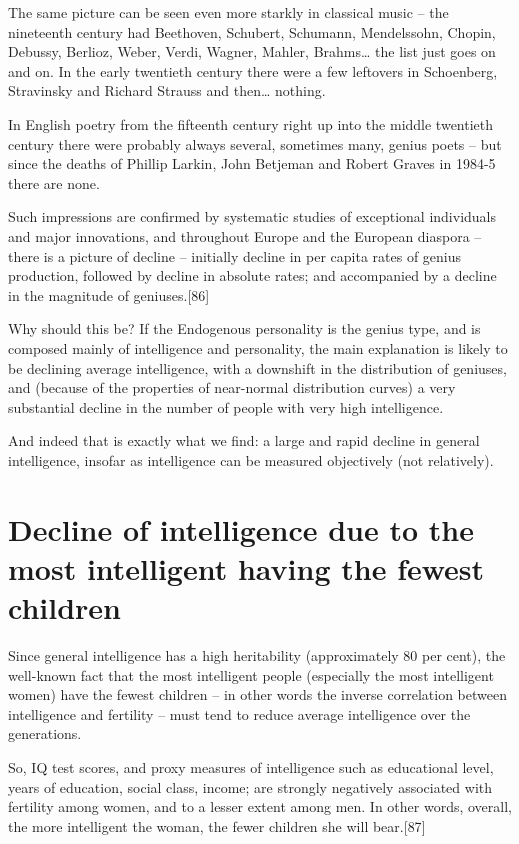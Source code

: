\documentclass[
]{book}
\begin{document}
The same picture can be seen even more starkly in classical music -- the nineteenth century had Beethoven, Schubert, Schumann, Mendelssohn, Chopin, Debussy, Berlioz, Weber, Verdi, Wagner, Mahler, Brahms\ldots{} the list just goes on and on. In the early twentieth century there were a few leftovers in Schoenberg, Stravinsky and Richard Strauss and then\ldots{} nothing.

In English poetry from the fifteenth century right up into the middle twentieth century there were probably always several, sometimes many, genius poets -- but since the deaths of Phillip Larkin, John Betjeman and Robert Graves in 1984-5 there are none.

Such impressions are confirmed by systematic studies of exceptional individuals and major innovations, and throughout Europe and the European diaspora -- there is a picture of decline -- initially decline in per capita rates of genius production, followed by decline in absolute rates; and accompanied by a decline in the magnitude of geniuses.{[}86{]}

Why should this be? If the Endogenous personality is the genius type, and is composed mainly of intelligence and personality, the main explanation is likely to be declining average intelligence, with a downshift in the distribution of geniuses, and (because of the properties of near-normal distribution curves) a very substantial decline in the number of people with very high intelligence.

And indeed that is exactly what we find: a large and rapid decline in general intelligence, insofar as intelligence can be measured objectively (not relatively).

\hypertarget{decline-of-intelligence-due-to-the-most-intelligent-having-the-fewest-children}{%
\section{Decline of intelligence due to the most intelligent having the fewest children}\label{decline-of-intelligence-due-to-the-most-intelligent-having-the-fewest-children}}

Since general intelligence has a high heritability (approximately 80 per cent), the well-known fact that the most intelligent people (especially the most intelligent women) have the fewest children -- in other words the inverse correlation between intelligence and fertility -- must tend to reduce average intelligence over the generations.

So, IQ test scores, and proxy measures of intelligence such as educational level, years of education, social class, income; are strongly negatively associated with fertility among women, and to a lesser extent among men. In other words, overall, the more intelligent the woman, the fewer children she will bear.{[}87{]}
\end{document}
